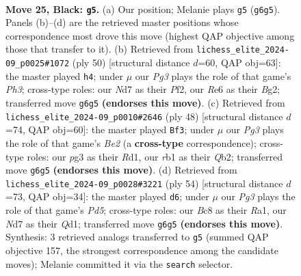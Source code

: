 \documentclass[11pt]{article}
\begin{document}
\clearpage

\begin{figure}[p]\centering
\begin{subfigure}{0.46\textwidth}\centering
\resizebox{\linewidth}{!}{%
\newchessgame
\chessboard[
  setfen={r1b3k1/1p1nq2p/4r1p1/p3Np2/2Q5/4P1P1/P4PKP/BR2R3 b - - 5 25},
  showmover=false,
  pgfstyle=straightmove, color=movearrow, markmove={g6-g5}
]}
\caption{}
\end{subfigure}\hfill
\begin{subfigure}{0.46\textwidth}\centering
\resizebox{\linewidth}{!}{%
\newchessgame
\chessboard[
  setfen={4r3/pp3rpk/2b4p/2qN1p2/2PRn3/6PP/PQ3PB1/2R3K1 w - - 4 26},
  showmover=false,
  pgfstyle=straightmove, color=movearrow, markmove={h3-h4}
]}
\caption{}
\end{subfigure}
\\[4pt]
\begin{subfigure}{0.46\textwidth}\centering
\resizebox{\linewidth}{!}{%
\newchessgame
\chessboard[
  setfen={r2r2k1/4qpp1/2p3bp/1p1n4/1P1R4/4P2P/1Q1NBPP1/3R2K1 w - - 2 25},
  showmover=false,
  pgfstyle=straightmove, color=movearrow, markmove={e2-f3}
]}
\caption{}
\end{subfigure}\hfill
\begin{subfigure}{0.46\textwidth}\centering
\resizebox{\linewidth}{!}{%
\newchessgame
\chessboard[
  setfen={r4r1k/4Nppp/b4q2/1p1P4/2p5/3n2P1/4RPBP/R2Q2K1 w - - 6 28},
  showmover=false,
  pgfstyle=straightmove, color=movearrow, markmove={d5-d6}
]}
\caption{}
\end{subfigure}
\caption{\textbf{Move 25, Black: \texttt{g5}.} (a) Our position; Melanie plays \texttt{g5} (\texttt{g6g5}). Panels (b)--(d) are the retrieved master positions whose correspondence most drove this move (highest QAP objective among those that transfer to it). (b) Retrieved from \texttt{lichess\_elite\_2024-09\_p0025\#1072} (ply 50) [structural distance $d$=60, QAP obj=63]: the master played \texttt{h4}; under $\mu$ our \emph{Pg3} plays the role of that game's \emph{Ph3}; cross-type roles: our \emph{N}d7 as their \emph{P}f2, our \emph{R}e6 as their \emph{B}g2; transferred move \texttt{g6g5} \textbf{(endorses this move)}. (c) Retrieved from \texttt{lichess\_elite\_2024-09\_p0010\#2646} (ply 48) [structural distance $d$=74, QAP obj=60]: the master played \texttt{Bf3}; under $\mu$ our \emph{Pg3} plays the role of that game's \emph{Be2} (a \textbf{cross-type} correspondence); cross-type roles: our \emph{p}g3 as their \emph{R}d1, our \emph{r}b1 as their \emph{Q}b2; transferred move \texttt{g6g5} \textbf{(endorses this move)}. (d) Retrieved from \texttt{lichess\_elite\_2024-09\_p0028\#3221} (ply 54) [structural distance $d$=73, QAP obj=34]: the master played \texttt{d6}; under $\mu$ our \emph{Pg3} plays the role of that game's \emph{Pd5}; cross-type roles: our \emph{B}c8 as their \emph{R}a1, our \emph{N}d7 as their \emph{Q}d1; transferred move \texttt{g6g5} \textbf{(endorses this move)}. Synthesis: 3 retrieved analogs transferred to \texttt{g5} (summed QAP objective 157, the strongest correspondence among the candidate moves); Melanie committed it via the \texttt{search} selector.}
\label{fig:thought-m49}
\end{figure}
\end{document}
